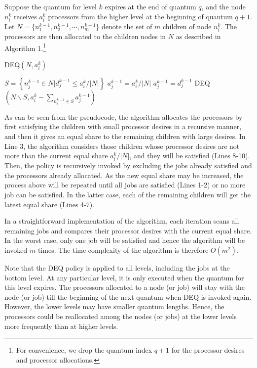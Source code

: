 \documentclass[10pt, a4paper]{article}
\newcommand{\set}[1]            {\left\{ #1 \right\}}
\newcommand{\card}[1]           {\left| #1\right|}
\begin{document}
Suppose the quantum for level $k$ expires at the end of quantum $q$, and the node $n_i^k$ receives
$a_i^k$ processors from the higher level at the beginning of quantum $q+1$. Let $N = \{n^{k-1}_1,
n^{k-1}_2, \cdots, n^{k-1}_m\}$ denote the set of $m$ children of node $n_i^k$. The processors are
then allocated to the children nodes in $N$ as described in Algorithm 1.\footnote{For convenience,
we drop the quantum index $q+1$ for the processor desires and processor allocations.}

\begin{algorithm}
\caption{DEQ$(N, a_i^k)$}
\begin{algorithmic}[1]
 \RETURN \ENDIF \STATE $S = \set{n^{k-1}_j\in N | d_j^{k-1} \le
a_i^k/\card{N}}$   \STATE $a^{k-1}_j =
a_i^k/\card{N}$ \ENDFOR \RETURN \ELSE {} \STATE $a^{k-1}_j = d^{k-1}_j$
\ENDFOR \STATE DEQ$(N\backslash  S, a_i^k - \sum_{n^{k-1}_i\in S}a^{k-1}_j)$ \ENDIF
\end{algorithmic}
\end{algorithm}

As can be seen from the pseudocode, the algorithm allocates the processors by first satisfying the
children with small processor desires in a recursive manner, and then it gives an equal share to
the remaining children with large desires. In Line 3, the algorithm considers those children whose
processor desires are not more than the current equal share $a_i^k/\card{N}$, and they will be
satisfied (Lines 8-10). Then, the policy is recursively invoked by excluding the jobs already
satisfied and the processors already allocated. As the new equal share may be increased, the
process above will be repeated until all jobs are satisfied (Lines 1-2) or no more job can be
satisfied. In the latter case, each of the remaining children will get the latest equal share
(Lines 4-7).

In a straightforward implementation of the algorithm, each iteration scans all remaining jobs and
compares their processor desires with the current equal share. In the worst case, only one job will
be satisfied and hence the algorithm will be invoked $m$ times. The time complexity of the
algorithm is therefore $O(m^2)$.

Note that the DEQ policy is applied to all levels, including the jobs at the bottom level. At any
particular level, it is only executed when the quantum for this level expires. The processors
allocated to a node (or job) will stay with the node (or job) till the beginning of the next
quantum when DEQ is invoked again. However, the lower levels may have smaller quantum lengths.
Hence, the processors could be reallocated among the nodes (or jobs) at the lower levels more
frequently than at higher levels.
\end{document}
